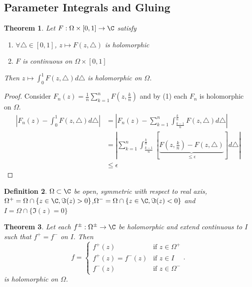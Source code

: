 \documentclass[a4paper]{article}
\newtheorem{thm}{Theorem}[section]
\newtheorem{defn}[thm]{Definition}
\begin{document}
\subsection{Parameter Integrals and Gluing}
\begin{thm}
    Let $F:\Omega\times [0,1]\to \C$ satisfy 
    \begin{enumerate}
        \item $\forall \triangle\in [0,1]$, $z\mapsto F(z,\triangle)$ is holomorphic    
        \item $F$ is continuous on $\Omega\times [0,1]$
    \end{enumerate}
    Then $z\mapsto \int_0^1 F(z,\triangle)d\triangle$ is holomorphic on $\Omega$. 
\end{thm}
\begin{proof}
    Consider $F_n(z)=\frac{1}{n}\sum_{k=1}^n F(z,\frac{k}{n})$ and by (1) each $F_n$ is holomorphic on $\Omega.$ 
    \begin{align*}
        \left |F_n(z)-\int_0^1 F(z,\triangle)d\triangle \right |&=\left |F_n(z)-\sum_{k=1}^n\int_{\frac{k-1}{n}}^{\frac{k}{n}} F(z,\triangle)d\triangle \right |\\
        &=\left |\sum_{k=1}^{n} \int_{\frac{k-1}{n}}^{\frac{k}{n}} \left[\underbrace{F(z,\tfrac{k}{n}) - F(z,\triangle)}_{\leq \epsilon}\right] d\triangle \right |\\
        &\leq \epsilon
    \end{align*}
\end{proof}
\begin{defn}
    $\Omega\subset \C$ be open, symmetric with respect to real axis, $\Omega^+=\Omega \cap \{z\in \C, \Im(z)>0\}$,$\Omega^-=\Omega \cap \{z\in \C, \Im(z)<0\}$ and $I=\Omega \cap \{\Im(z)=0\}$
\end{defn}
\begin{thm}
    Let each $f^\pm:\Omega^\pm\to \C$ be holomorphic and extend continuous to $I$ such that $f^+=f^-$ on $I.$ Then \[
    f=\begin{cases}
        f^+(z) & \text{if } z\in \Omega^+ \\
        f^+(z)=f^-(z) & \text{if } z\in I\\ 
        f^-(z) & \text{if } z\in \Omega^-
    \end{cases}
    .\] 
    is holomorphic on $\Omega$. 
\end{thm}
\end{document}
